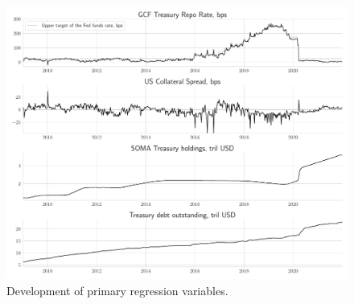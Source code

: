 \documentclass[11pt,a4paper,english,oneside]{article}
\begin{document}
\begin{figure}[htb!]
  \begin{center}
    \caption{Development of primary regression variables.}
    \label{fig:vars}
    \includegraphics[width=0.99\linewidth]{main_vars.pdf}
  \end{center}
\end{figure}

\clearpage
\end{document}
